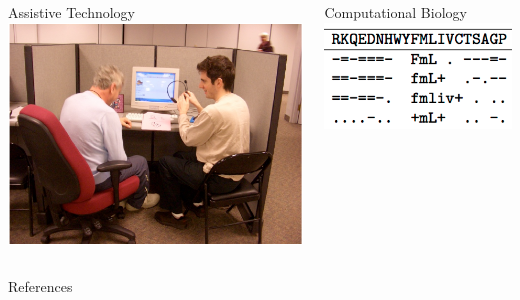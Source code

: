 \documentclass[xcolor=dvipsnames]{beamer}
\begin{document}
{\begin{columns}
    \begin{block}{Assistive Technology}
     \centering
        \includegraphics[width=0.4\linewidth]{evocation/figures/jordan_at_adler}
        \\
     \small
       \cite{boyd-graber-06b,ma-09,nikolova-09}
    \end{block}




   \begin{block}{Computational Biology}
     \centering
     \includegraphics[width=0.4\linewidth]{general_figures/protein} \\
     \small
     \cite{nguyen-13b,hu-13:coalescent}
   \end{block}


\end{columns}

}






\begin{frame}{References}

\tiny

\end{frame}
\end{document}
